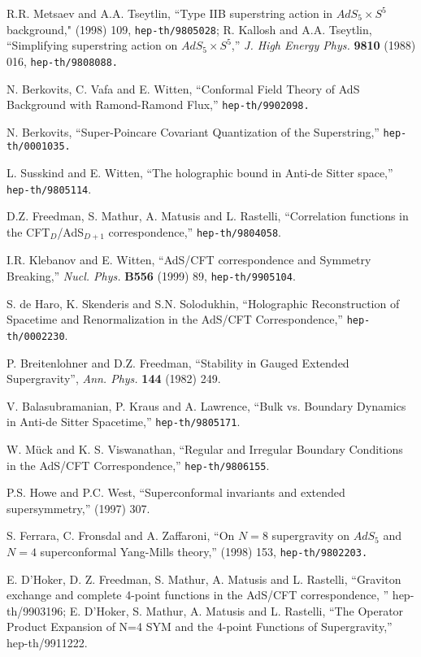 \documentclass[12pt]{article}
\begin{document}
\begin{thebibliography}{99}
R.R. Metsaev  and  A.A. Tseytlin,
``Type IIB superstring action in
 $AdS_5 \times S^5$ background,"
 (1998) 109, {\tt hep-th/9805028};
R. Kallosh and A.A. Tseytlin, ``Simplifying
    superstring action on $AdS_5\times S^5$,''
    {\em J. High Energy Phys.} {\bf 9810} (1988) 016,
{\tt hep-th/9808088.}

N. Berkovits, C. Vafa and E. Witten,
``Conformal Field Theory of AdS Background with Ramond-Ramond Flux,''
{\tt hep-th/9902098.}

N. Berkovits,
``Super-Poincare Covariant Quantization of the Superstring,''
{\tt hep-th/0001035.}

L. Susskind and E. Witten, ``The holographic bound in Anti-de Sitter
space,'' {{\tt hep-th/9805114}}.

D.Z. Freedman, S. Mathur, A. Matusis and L. Rastelli,
``Correlation functions in the CFT$_D$/AdS$_{D+1}$ correspondence,''
{{\tt hep-th/9804058}}.

I.R. Klebanov and E. Witten,
``AdS/CFT correspondence and Symmetry Breaking,''
{\em Nucl. Phys.} {\bf B556} (1999) 89,
{{\tt hep-th/9905104}}.

S. de Haro, K. Skenderis and S.N. Solodukhin,
``Holographic Reconstruction of Spacetime and Renormalization in the AdS/CFT
Correspondence,'' {{\tt hep-th/0002230}}.

P. Breitenlohner and D.Z. Freedman,
``Stability in Gauged Extended Supergravity'',
{\it Ann. Phys.} {\bf 144} (1982) 249.

V. Balasubramanian, P. Kraus and A. Lawrence,
``Bulk vs. Boundary Dynamics in Anti-de Sitter Spacetime,''
{{\tt hep-th/9805171}}.


W. M\" uck and K. S. Viswanathan, ``Regular and Irregular Boundary
Conditions in the AdS/CFT Correspondence,''
{{\tt hep-th/9806155}}.


P.S. Howe and P.C. West,
``Superconformal invariants and extended supersymmetry,''
 (1997) 307.
 
S. Ferrara, C. Fronsdal and A. Zaffaroni,
``On $N=8$ supergravity on $AdS_5$ and $N=4$ superconformal Yang-Mills
theory,''
 (1998) 153, {\tt hep-th/9802203.}

E. D'Hoker, D. Z. Freedman, S. Mathur, A. Matusis and L. Rastelli,
``Graviton exchange and complete 4-point functions in the AdS/CFT
correspondence, ''
hep-th/9903196;
E. D'Hoker, S. Mathur, A. Matusis and L. Rastelli,
``The Operator Product Expansion of N=4 SYM 
and the 4-point Functions of Supergravity,''
hep-th/9911222.


\end{thebibliography}
\end{document}
